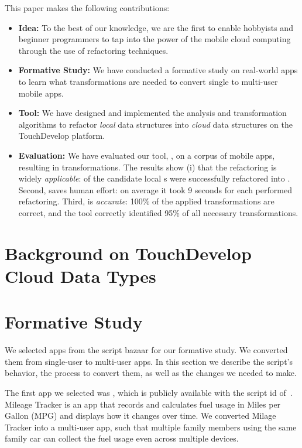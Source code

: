 \documentclass{sigplanconf}
\begin{document}
This paper makes the following contributions:
\begin{itemize}
\item{\textbf{Idea:}} To the best of our knowledge, we are the first to enable hobbyists and beginner programmers to tap into the power of the mobile cloud
computing through the use of refactoring techniques.

\item{\textbf{Formative Study:}} We have conducted a formative study on \numFormative real-world apps to learn what transformations are needed to convert single to multi-user mobile apps. 

\item{\textbf{Tool:}} We have designed and implemented the analysis and transformation algorithms to refactor \emph{local} data structures into \emph{cloud} data structures on the TouchDevelop platform. 

\item{\textbf{Evaluation:}} We have evaluated our tool, \tool, on a corpus of \numScripts mobile apps, resulting in \numTransformations transformations. The results show (i) that the refactoring is widely \emph{applicable}: \percentRefactored of the candidate local s were successfully refactored into . Second, \tool saves human effort: on average it took 9 seconds for each performed refactoring. Third, \tool is  
\emph{accurate}: 100\% of the applied transformations are correct, and the tool correctly identified 95\% of all necessary transformations.  
\end{itemize}

\section{Background on TouchDevelop Cloud Data Types}


\section{Formative Study}

We selected \numFormative apps from the \TD script bazaar for our formative study. We converted them from single-user to multi-user apps. In this section we describe the script's behavior, the process to convert them, as well as the changes we needed to make.

The first app we selected was \MT, which is publicly available with the script id of~\cite{MileageTracker}.  Mileage Tracker is an app that records and calculates fuel usage in Miles per Gallon (MPG) and displays how it changes over time. We converted Milage Tracker into a multi-user app, such that multiple family members using the same family car can collect the fuel usage even across multiple devices.
\end{document}
